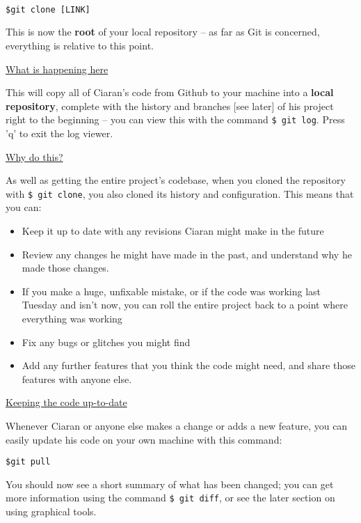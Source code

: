 \documentclass[11pt, a4paper, english]{article}
\begin{document}
\begin{verbatim}

$git clone [LINK]

\end{verbatim}

This is now the \textbf{root} of your local repository -- as far as Git is concerned, everything is relative to this point.


\underline{What is happening here}

This will copy all of Ciaran's code from Github to your machine into a \textbf{local repository}, complete with the history and branches [see later] of his project right to the beginning -- you can view this with the command \verb|$ git log|. Press 'q' to exit the log viewer.

\underline{Why do this?}

As well as getting the entire project's codebase, when you cloned the repository with \verb|$ git clone|, you also cloned its history and configuration. This means that you can:

\begin{itemize}
\item Keep it up to date with any revisions Ciaran might make in the future
\item Review any changes he might have made in the past, and understand why he made those changes.
\item If you make a huge, unfixable mistake, or if the code was working last Tuesday and isn't now, you can roll the entire project back to a point where everything was working
\item Fix any bugs or glitches you might find
\item Add any further features that you think the code might need, and share those features with anyone else.
\end{itemize}

\underline{Keeping the code up-to-date}

Whenever Ciaran or anyone else makes a change or adds a new feature, you can easily update his code on your own machine with this command:

\begin{verbatim}
$git pull
\end{verbatim}

You should now see a short summary of what has been changed; you can get more information using the command \verb|$ git diff|, or see the later section on using graphical tools.
\end{document}
